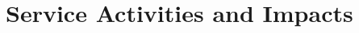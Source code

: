 \documentclass[11pt,titlepage]{article}
\begin{document}

\part{Service Activities and Impacts}\label{section:service}  %
\end{document}
